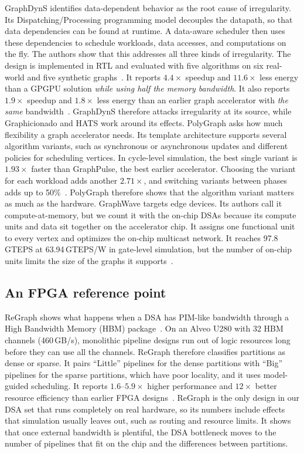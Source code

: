 \documentclass[journal,onecolumn]{IEEEtran}
\begin{document}
GraphDynS identifies data-dependent behavior as the root cause of irregularity. Its Dispatching/Processing programming model decouples the datapath, so that data dependencies can be found at runtime. A data-aware scheduler then uses these dependencies to schedule workloads, data accesses, and computations on the fly. The authors show that this addresses all three kinds of irregularity. The design is implemented in RTL and evaluated with five algorithms on six real-world and five synthetic graphs~\cite{yan2019graphdyns}. It reports $4.4\times$ speedup and $11.6\times$ less energy than a GPGPU solution \emph{while using half the memory bandwidth}. It also reports $1.9\times$ speedup and $1.8\times$ less energy than an earlier graph accelerator with \emph{the same} bandwidth~\cite{yan2019graphdyns}. GraphDynS therefore attacks irregularity at its source, while Graphicionado and HATS work around its effects. PolyGraph asks how much flexibility a graph accelerator needs. Its template architecture supports several algorithm variants, such as synchronous or asynchronous updates and different policies for scheduling vertices. In cycle-level simulation, the best single variant is $1.93\times$ faster than GraphPulse, the best earlier accelerator. Choosing the variant for each workload adds another $2.71\times$, and switching variants between phases adds up to 50\%~\cite{dadu2021polygraph}. PolyGraph therefore shows that the algorithm variant matters as much as the hardware. GraphWave targets edge devices. Its authors call it compute-at-memory, but we count it with the on-chip DSAs because its compute units and data sit together on the accelerator chip. It assigns one functional unit to every vertex and optimizes the on-chip multicast network. It reaches 97.8\,GTEPS at 63.94\,GTEPS/W in gate-level simulation, but the number of on-chip units limits the size of the graphs it supports~\cite{lee2022graphwave}.

\subsection{An FPGA reference point}
ReGraph shows what happens when a DSA has PIM-like bandwidth through a High Bandwidth Memory (HBM) package~\cite{chen2022regraph}. On an Alveo U280 with 32 HBM channels (460\,GB/s), monolithic pipeline designs run out of logic resources long before they can use all the channels. ReGraph therefore classifies partitions as dense or sparse. It pairs ``Little'' pipelines for the dense partitions with ``Big'' pipelines for the sparse partitions, which have poor locality, and it uses model-guided scheduling. It reports $1.6$--$5.9\times$ higher performance and $12\times$ better resource efficiency than earlier FPGA designs~\cite{chen2022regraph}. ReGraph is the only design in our DSA set that runs completely on real hardware, so its numbers include effects that simulation usually leaves out, such as routing and resource limits. It shows that once external bandwidth is plentiful, the DSA bottleneck moves to the number of pipelines that fit on the chip and the differences between partitions.
\end{document}
